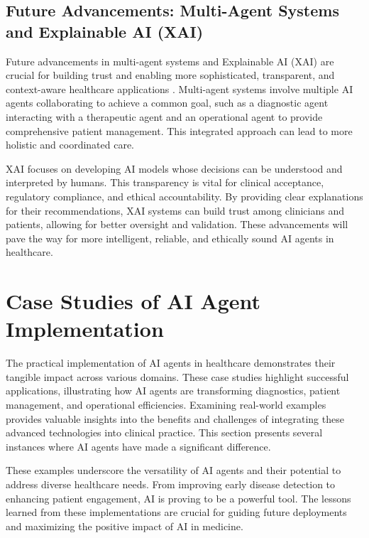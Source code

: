 \documentclass[12pt,a4paper]{article}
\begin{document}
\subsection{Future Advancements: Multi-Agent Systems and Explainable AI (XAI)}
\label{subsec:future-advancements}
Future advancements in multi-agent systems and Explainable AI (XAI) are crucial for building trust and enabling more sophisticated, transparent, and context-aware healthcare applications \cite{nih_ethical_implications}. Multi-agent systems involve multiple AI agents collaborating to achieve a common goal, such as a diagnostic agent interacting with a therapeutic agent and an operational agent to provide comprehensive patient management. This integrated approach can lead to more holistic and coordinated care.

XAI focuses on developing AI models whose decisions can be understood and interpreted by humans. This transparency is vital for clinical acceptance, regulatory compliance, and ethical accountability. By providing clear explanations for their recommendations, XAI systems can build trust among clinicians and patients, allowing for better oversight and validation. These advancements will pave the way for more intelligent, reliable, and ethically sound AI agents in healthcare.

\section{Case Studies of AI Agent Implementation}
\label{sec:case-studies}
The practical implementation of AI agents in healthcare demonstrates their tangible impact across various domains. These case studies highlight successful applications, illustrating how AI agents are transforming diagnostics, patient management, and operational efficiencies. Examining real-world examples provides valuable insights into the benefits and challenges of integrating these advanced technologies into clinical practice. This section presents several instances where AI agents have made a significant difference.

These examples underscore the versatility of AI agents and their potential to address diverse healthcare needs. From improving early disease detection to enhancing patient engagement, AI is proving to be a powerful tool. The lessons learned from these implementations are crucial for guiding future deployments and maximizing the positive impact of AI in medicine.
\end{document}
